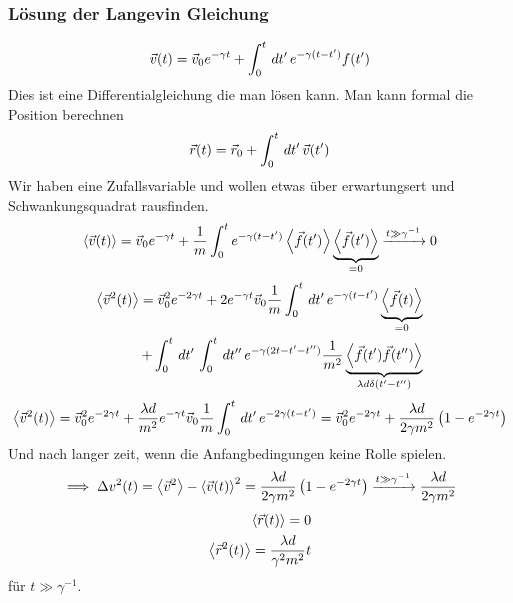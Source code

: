 \begin{description}
\subsubsection*{Lösung der Langevin Gleichung}
%
\begin{align*}
  \vec{v}(t) = \vec{v}_0 e^{- \gamma t} + \int_{0}^{t} \,dt'\, e^{- \gamma(t - t')} f(t')
\end{align*}
%
Dies ist eine Differentialgleichung die man lösen kann. Man kann formal die
Position berechnen
%
\begin{align*}
  \vec{r}(t) = \vec{r}_0 + \int_{0}^{t} \,dt'\, \vec{v}(t')
\end{align*}
%
Wir haben eine Zufallsvariable und wollen etwas über erwartungsert und
Schwankungsquadrat rausfinden.
%
\begin{align*}
  \Braket{\vec{v}(t)} = \vec{v}_0 e^{-\gamma t} + \frac{1}{m} \int_{0}^{t}
  e^{-\gamma(t - t')} \Braket{\vec{f}(t')} \underbrace{\Braket{\vec{f}(t')}}_{=0} \xrightarrow{t \gg \gamma^{-1}} 0
\end{align*}
%
%
\begin{align*}
  \Braket{\vec{v}^2(t)} = \vec{v}_0^2 e^{-2\gamma t} + 2 e^{-\gamma t} \vec{v}_0 \frac{1}{m}
  \int_{0}^{t} \,dt'\, e^{-\gamma(t- t')} \underbrace{\Braket{\vec{f}(t)}}_{=0} \\
  + \int_{0}^{t} \,dt'\, \int_{0}^{t} \,dt''\, e^{-\gamma(2 t - t' - t'') }\frac{1}{m^2}
  \underbrace{\Braket{\vec{f}(t') \vec{f}(t'')}}_{\lambda d \delta(t' - t'')}
\end{align*}
%
\begin{align*}
  \Braket{\vec{v}^2(t)} = \vec{v}_0^2 e^{-2\gamma t} + \frac{\lambda d}{m^2} e^{-\gamma t} \vec{v}_0 \frac{1}{m}
  \int_{0}^{t} \,dt'\, e^{- 2 \gamma(t- t')} = \vec{v}_0^2 e^{-2 \gamma t} + \frac{\lambda d}{ 2 \gamma m^2}
  \left( 1- e^{-2 \gamma t} \right)
\end{align*}
Und nach langer zeit, wenn die Anfangbedingungen keine Rolle spielen.
%
\begin{align*}
  \implies \Delta v^2(t) = \Braket{\vec{v}^2} - \Braket{\vec{v}(t)}^2
  = \frac{\lambda d}{ 2 \gamma m^2} \left( 1 - e^{-2 \gamma t} \right)
  \xrightarrow{t \gg \gamma^{-1}} \frac{ \lambda d }{ 2 \gamma m^2}
\end{align*}
%
%
\begin{align*}
  \Braket{\vec{r}(t)} = 0 \\
  \Braket{\vec{r}^2(t)} = \frac{ \lambda d }{\gamma^2 m^2} t
\end{align*}
%
für $ t \gg \gamma^{-1}$.


\end{description}
